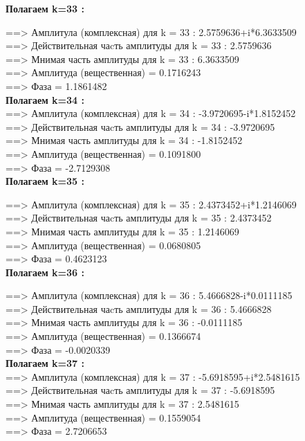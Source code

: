 \documentclass[a4paper,11pt]{article}
\begin{document}
\begin{flushleft}
\textbf{Полагаем k=33 :\\} 

 ==> Амплитула (комплексная) для k = 33 :  2.5759636+i*6.3633509\\ 
 ==> Действительная чаcть амплитуды  для k = 33 : 2.5759636\\ 
 ==> Мнимая часть амплитуды  для k = 33 : 6.3633509\\ 
 ==> Амплитуда (вещественная) = 0.1716243\\ 
 ==> Фаза = 1.1861482\\ 

\textbf{Полагаем k=34 :\\} 
 ==> Амплитула (комплексная) для k = 34 : -3.9720695-i*1.8152452\\ 
 ==> Действительная чаcть амплитуды  для k = 34 : -3.9720695\\ 
 ==> Мнимая часть амплитуды  для k = 34 : -1.8152452\\ 
 ==> Амплитуда (вещественная) = 0.1091800\\ 
 ==> Фаза = -2.7129308\\ 

\textbf{Полагаем k=35 :\\} 

 ==> Амплитула (комплексная) для k = 35 :  2.4373452+i*1.2146069\\ 
 ==> Действительная чаcть амплитуды  для k = 35 : 2.4373452\\ 
 ==> Мнимая часть амплитуды  для k = 35 : 1.2146069\\ 
 ==> Амплитуда (вещественная) = 0.0680805\\ 
 ==> Фаза = 0.4623123\\ 

\textbf{Полагаем k=36 :\\} 

 ==> Амплитула (комплексная) для k = 36 :  5.4666828-i*0.0111185\\ 
 ==> Действительная чаcть амплитуды  для k = 36 : 5.4666828\\ 
 ==> Мнимая часть амплитуды  для k = 36 : -0.0111185\\ 
 ==> Амплитуда (вещественная) = 0.1366674\\ 
 ==> Фаза = -0.0020339\\ 

\textbf{Полагаем k=37 :\\} 
 ==> Амплитула (комплексная) для k = 37 : -5.6918595+i*2.5481615\\ 
 ==> Действительная чаcть амплитуды  для k = 37 : -5.6918595\\ 
 ==> Мнимая часть амплитуды  для k = 37 : 2.5481615\\ 
 ==> Амплитуда (вещественная) = 0.1559054\\ 
 ==> Фаза = 2.7206653\\ 


\end{flushleft}
\end{document}
